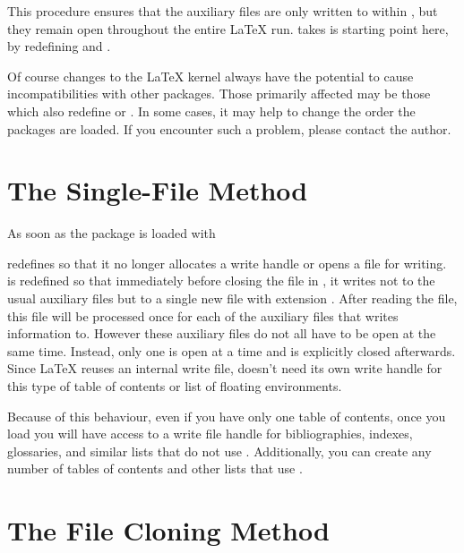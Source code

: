 This procedure ensures that the auxiliary files are only written to within
, but they remain open throughout the entire
\LaTeX{} run.  takes is starting point here, by redefining
 and .

Of course changes to the \LaTeX{} kernel always have the
potential to cause incompatibilities with other packages. Those primarily
affected may be those which also redefine  or
. In some cases, it may help to change the order the
packages are loaded. If you encounter such a problem, please contact the
\KOMAScript{} author.

\section{The Single-File Method}

As soon as the package is loaded with
\begin{lstcode}
  \usepackage{scrwfile}
\end{lstcode}
 redefines  so that it
no longer allocates a write handle or opens a file for writing.
 is redefined so that immediately before closing the
 file in , it writes not to the
usual auxiliary files but to a single new file with extension .
After reading the  file, this  file will be processed once
for each of the auxiliary files that  writes information to.
However these auxiliary files do not all have to be open at the same time.
Instead, only one is open at a time and is explicitly closed afterwards. Since
\LaTeX{} reuses an internal write file,  doesn't need its
own write handle for this type of table of contents or list of floating
environments.

Because of this behaviour, even if you have only one table of contents, once
you load  you will have access to a write file handle for
bibliographies, indexes, glossaries, and similar lists that do not use
. Additionally, you can create any number of tables of
contents and other lists that use .

\section{The File Cloning Method}

